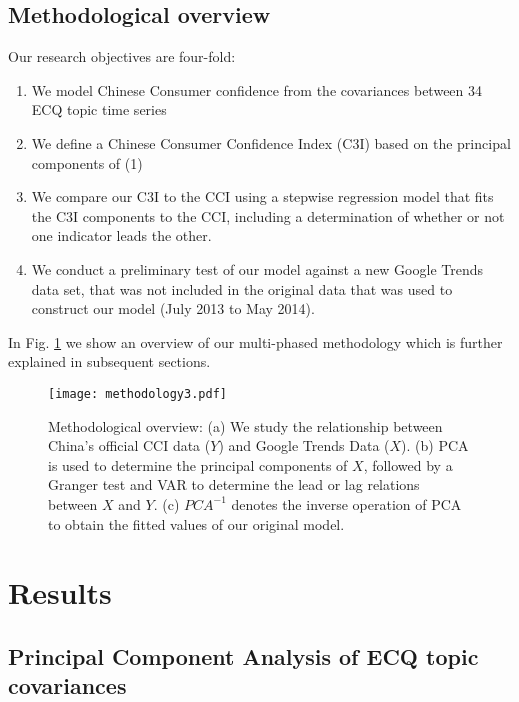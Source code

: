 \documentclass[10pt]{article}
\begin{document}
	\subsection*{Methodological overview}
	
	Our research objectives are four-fold:
	
	\begin{enumerate}
		\item We model Chinese Consumer confidence from the covariances between 34 ECQ topic time series
		\item We define a Chinese Consumer Confidence Index (C3I) based on the principal components of (1)
		\item We compare our C3I to the CCI using a stepwise regression model that fits the C3I components to the CCI,
		 	including a determination of whether or not one indicator leads the other.
		\item We conduct a preliminary test of our model against a new Google Trends data set, that was not included in the original
			data that was used to construct our model (July 2013 to May 2014).
	\end{enumerate}

In Fig. \ref{Methodology} we show an overview of our multi-phased methodology which is further explained in subsequent sections.

	\begin{figure}[h!]
	\begin{center}
	      \texttt{[image: methodology3.pdf]}
\caption{ \label{Methodology} Methodological overview: (a) We study the relationship between China's official CCI data ($Y$) and Google Trends Data ($X$). (b) PCA is used to determine the principal components of $X$, followed by a Granger test and VAR to determine the lead or lag relations between $X$ and $Y$. (c) $PCA^{-1}$ denotes the 
	inverse operation of PCA to obtain the fitted values of our original model. }
	\end{center}
	\end{figure}

\section*{Results}

	\subsection*{Principal Component Analysis of ECQ topic covariances}
\end{document}
